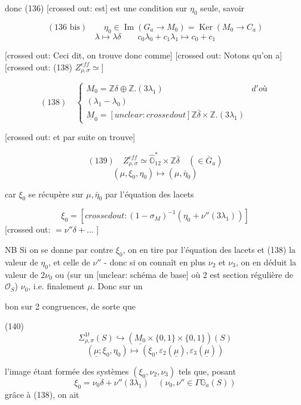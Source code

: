 \newpage


donc (136) [crossed out: est] est une condition sur $\eta_0$ seule, savoir

$$ (136 \text{ bis}) \qquad \eta_0 \in \operatorname{Im} ( G_a \to M_0) = \operatorname{Ker} (M_0 \to C_a) $$
$$ \lambda \mapsto \lambda \delta \qquad c_0 \lambda_0 + c_1 \lambda_1 \mapsto c_0+c_1 $$

[crossed out: Ceci dit, on trouve donc comme]
[crossed out: Notons qu'on a]
[crossed out: (138) $Z_{\rho,\sigma}^{eff} \simeq$]

$$ (138) \quad \begin{cases} M_0 = \mathbb{Z} \delta \oplus \mathbb{Z}.(3\lambda_1) & d'où \\ (\lambda_1-\lambda_0) \\ \underline{M}_0 = [unclear: crossed out] \mathbb{Z} \bar{\delta} \times \mathbb{Z}.(3\lambda_1) \end{cases} $$

[crossed out: et par suite on trouve]

$$ (139) \quad Z_{\rho,\sigma}^{eff} \simeq \hat{\mathbb{O}}_{12}^* \times \mathbb{Z} \bar{\delta} \quad (\in \bar{G}_a) $$
$$ (\mu, \xi_0, \eta_0) \mapsto (\mu, \bar{\eta}_0) $$

car $\xi_0$ se récupère sur $\mu, \bar{\eta}_0$ par l'équation des lacets

$$ \xi_0 = [crossed out: (1-\sigma_M)^{-1} (\eta_0 + \nu''(3\lambda_1))] $$
[crossed out: $= \nu'' \delta + \dots$ ]

NB Si on se donne par contre $\xi_0$, on en tire par l'équation des lacets et (138) la valeur de $\eta_0$, et celle de $\nu''$ - donc si on connaît en plus $\nu_2$ et $\nu_3$, on en déduit la valeur de $2\nu_0$ ou (sur un [unclear: schéma de base] où 2 est section régulière de $\mathcal{O}_S$) $\nu_0$, i.e. finalement $\mu$. Donc sur un

\newpage


bon sur 2 congruences, de sorte que

(140) $$ \Sigma_{\rho,\sigma}^{1t}(S) \hookrightarrow (\underline{M_0} \times \{0,1\} \times \{0,1\})(S) $$
$$ (\underline{\mu}; \xi_0, \eta_0) \longmapsto (\xi_0, \varepsilon_2(\underline{\mu}), \varepsilon_3(\underline{\mu})) $$

l'image étant formée des systèmes
$(\xi_0, \nu_2, \nu_3)$ tels que, posant
$$ \xi_0 = \nu_0 \delta + \nu''(3\lambda_1) \quad (\nu_0, \nu'' \in \Gamma \mathbb{G}_a(S)) $$
grâce à (138), on ait

